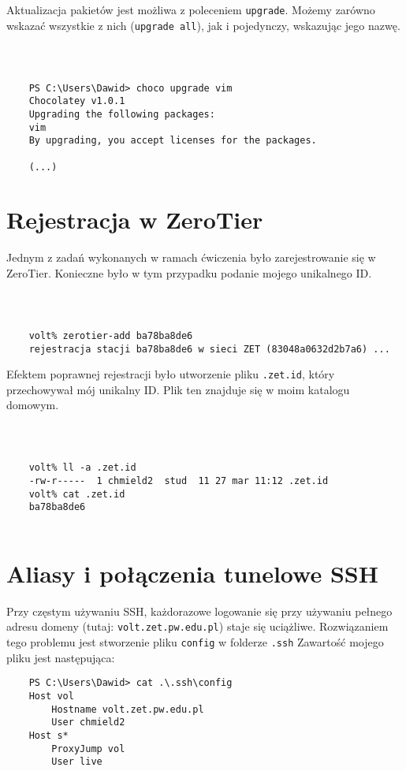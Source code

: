 \documentclass[a4paper,11pt]{article}
\begin{document}
Aktualizacja pakietów jest możliwa z poleceniem {\tt upgrade}. Możemy zarówno wskazać wszystkie z nich ({\tt upgrade all}), jak i pojedynczy, wskazując jego nazwę.

{\tt
\begin{verbatim}

    PS C:\Users\Dawid> choco upgrade vim
    Chocolatey v1.0.1
    Upgrading the following packages:
    vim
    By upgrading, you accept licenses for the packages.
    
    (...)

\end{verbatim}
}

\section{Rejestracja w ZeroTier}

Jednym z zadań wykonanych w ramach ćwiczenia było zarejestrowanie się w ZeroTier. Konieczne było w tym przypadku podanie mojego unikalnego ID. 

{\tt
\begin{verbatim}

    volt% zerotier-add ba78ba8de6
    rejestracja stacji ba78ba8de6 w sieci ZET (83048a0632d2b7a6) ...

\end{verbatim}
}

Efektem poprawnej rejestracji było utworzenie pliku {\tt .zet.id}, który przechowywał mój unikalny ID. Plik ten znajduje się w moim katalogu domowym.

{\tt
\begin{verbatim}

    volt% ll -a .zet.id
    -rw-r-----  1 chmield2  stud  11 27 mar 11:12 .zet.id
    volt% cat .zet.id
    ba78ba8de6
    
\end{verbatim}
}

\section{Aliasy i połączenia tunelowe SSH}

Przy częstym używaniu SSH, każdorazowe logowanie się przy używaniu pełnego adresu domeny (tutaj: {\tt volt.zet.pw.edu.pl}) staje się uciążliwe. Rozwiązaniem tego problemu jest stworzenie pliku {\tt config} w folderze {\tt .ssh} Zawartość mojego pliku jest następująca:

\begin{verbatim}
    PS C:\Users\Dawid> cat .\.ssh\config
    Host vol
        Hostname volt.zet.pw.edu.pl
        User chmield2
    Host s*
        ProxyJump vol
        User live
\end{verbatim}
\end{document}
